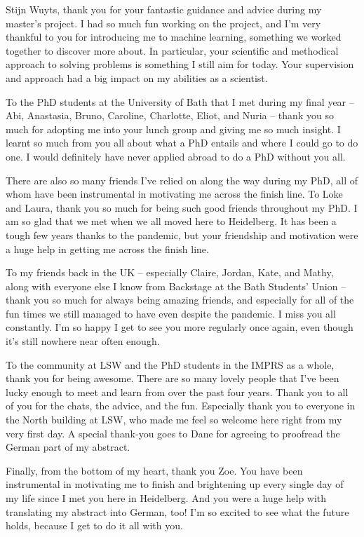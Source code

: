 Stijn Wuyts, thank you for your fantastic guidance and advice during my master's project. I had so much fun working on the project, and I'm very thankful to you for introducing me to machine learning, something we worked together to discover more about. In particular, your scientific and methodical approach to solving problems is something I still aim for today. Your supervision and approach had a big impact on my abilities as a scientist.

To the PhD students at the University of Bath that I met during my final year -- Abi, Anastasia, Bruno, Caroline, Charlotte, Eliot, and Nuria -- thank you so much for adopting me into your lunch group and giving me so much insight. I learnt so much from you all about what a PhD entails and where I could go to do one. I would definitely have never applied abroad to do a PhD without you all.

There are also so many friends I've relied on along the way during my PhD, all of whom have been instrumental in motivating me across the finish line. To Loke and Laura, thank you so much for being such good friends throughout my PhD. I am so glad that we met when we all moved here to Heidelberg. It has been a tough few years thanks to the pandemic, but your friendship and motivation were a huge help in getting me across the finish line.

To my friends back in the UK -- especially Claire, Jordan, Kate, and Mathy, along with everyone else I know from Backstage at the Bath Students' Union -- thank you so much for always being amazing friends, and especially for all of the fun times we still managed to have even despite the pandemic. I miss you all constantly. I'm so happy I get to see you more regularly once again, even though it's still nowhere near often enough.

To the community at LSW and the PhD students in the IMPRS as a whole, thank you for being awesome. There are so many lovely people that I've been lucky enough to meet and learn from over the past four years. Thank you to all of you for the chats, the advice, and the fun. Especially thank you to everyone in the North building at LSW, who made me feel so welcome here right from my very first day. A special thank-you goes to Dane for agreeing to proofread the German part of my abstract.

Finally, from the bottom of my heart, thank you Zoe. You have been instrumental in motivating me to finish and brightening up every single day of my life since I met you here in Heidelberg. And you were a huge help with translating my abstract into German, too! I'm so excited to see what the future holds, because I get to do it all with you.
